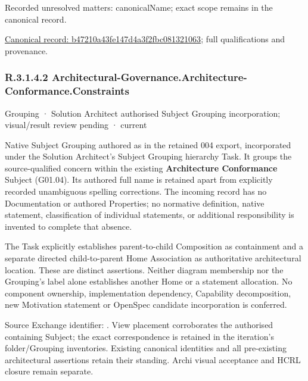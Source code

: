 {\small Recorded unresolved matters: canonicalName; exact scope remains in the canonical record.}\par
{\footnotesize \href{../../../../continuum/grouping/b47210a43fe147d4a3f2fbc081321063.md}{Canonical record: b47210a43fe147d4a3f2fbc081321063}; full qualifications and provenance.}\par
\subsubsection*{R.3.1.4.2 Architectural-Governance.Architecture-Conformance.Constraints}
\label{navigation:R.3.1.4.2}

\label{element:46dd1f4490ae47cc854ce70ff600cb47}
{\small Grouping · Solution Architect authorised Subject Grouping incorporation; visual/result review pending · current}\par

Native Subject Grouping authored as \texttt{} in the retained 004 export,
incorporated under the Solution Architect's Subject Grouping hierarchy Task.
It groups the source-qualified \texttt{} concern within
the existing \textbf{Architecture Conformance} Subject (G01.04). Its authored full name
is retained apart from explicitly recorded unambiguous spelling corrections.
The incoming record has no Documentation or authored Properties; no normative
definition, native statement, classification of individual statements, or
additional responsibility is invented to complete that absence.



The Task explicitly establishes parent-to-child Composition as containment and
a separate directed child-to-parent Home Association as authoritative architectural
location. These are distinct assertions. Neither diagram membership nor the
Grouping's label alone establishes another Home or a statement allocation.
No component ownership, implementation dependency, Capability decomposition,
new Motivation statement or OpenSpec candidate incorporation is conferred.



Source Exchange identifier: \texttt{}. View placement corroborates
the authorised containing Subject; the exact correspondence is retained in the
iteration's folder/Grouping inventories. Existing canonical identities and all
pre-existing architectural assertions retain their standing. Archi visual
acceptance and HCRL closure remain separate.



